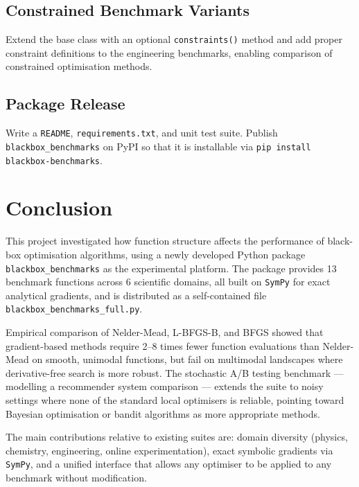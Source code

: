 \subsection{Constrained Benchmark Variants}
Extend the base class with an optional \texttt{constraints()} method
and add proper constraint definitions to the engineering benchmarks,
enabling comparison of constrained optimisation methods.

\subsection{Package Release}
Write a \texttt{README}, \texttt{requirements.txt}, and unit test
suite. Publish \texttt{blackbox\_benchmarks} on PyPI so that it is
installable via \texttt{pip install blackbox-benchmarks}.

\clearpage

\section{Conclusion}

This project investigated how function structure affects the performance
of black-box optimisation algorithms, using a newly developed Python
package \texttt{blackbox\_benchmarks} as the experimental platform. The
package provides 13 benchmark functions across 6 scientific domains,
all built on \texttt{SymPy} for exact analytical gradients, and is
distributed as a self-contained file
\texttt{blackbox\_benchmarks\_full.py}.

Empirical comparison of Nelder-Mead, L-BFGS-B, and BFGS showed that
gradient-based methods require 2--8 times fewer function evaluations
than Nelder-Mead on smooth, unimodal functions, but fail on multimodal
landscapes where derivative-free search is more robust. The stochastic
A/B testing benchmark — modelling a recommender system comparison —
extends the suite to noisy settings where none of the standard local
optimisers is reliable, pointing toward Bayesian optimisation or
bandit algorithms as more appropriate methods.

The main contributions relative to existing suites are: domain
diversity (physics, chemistry, engineering, online experimentation),
exact symbolic gradients via \texttt{SymPy}, and a unified interface
that allows any optimiser to be applied to any benchmark without
modification.

\clearpage

\printbibliography[heading=bibintoc,title={References}]

